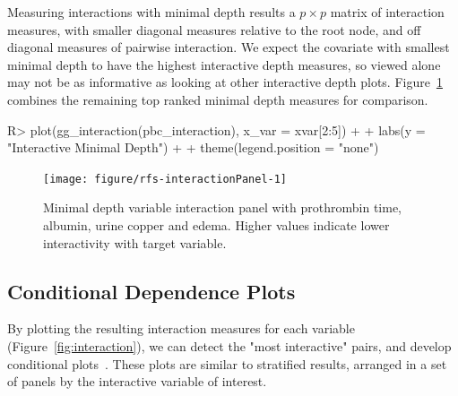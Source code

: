 \documentclass[nojss]{jss}\usepackage[]{graphicx}\usepackage[]{color}
\begin{document}
Measuring interactions with minimal depth results a $p \times p$ matrix of interaction measures, with smaller diagonal measures relative to the root node, and off diagonal measures of pairwise interaction. We expect the covariate with smallest minimal depth to have the highest interactive depth measures, so viewed alone may not be as informative as looking at other interactive depth plots. Figure~\ref{fig:interactionPanel} combines the remaining top ranked minimal depth measures for comparison.
\begin{Schunk}
\begin{Sinput}
R> plot(gg_interaction(pbc_interaction), x_var = xvar[2:5]) + 
+   labs(y = "Interactive Minimal Depth") + 
+   theme(legend.position = "none")
\end{Sinput}
\begin{figure}[!htpb]

{\centering \texttt{[image: figure/rfs-interactionPanel-1]} 

}

\caption[Minimal depth variable interaction panel with prothrombin time, albumin, urine copper and edema]{Minimal depth variable interaction panel with prothrombin time, albumin, urine copper and edema. Higher values indicate lower interactivity with target variable.\label{fig:interactionPanel}}
\end{figure}
\end{Schunk}

\subsection{Conditional Dependence Plots}

By plotting the resulting interaction measures for each variable (Figure~\ref{fig:interaction}), we can detect the "most interactive" pairs, and develop conditional plots~\cite{chambers:1992, cleveland:1993}. These plots are similar to stratified results, arranged in a set of panels by the interactive variable of interest. 
\end{document}
